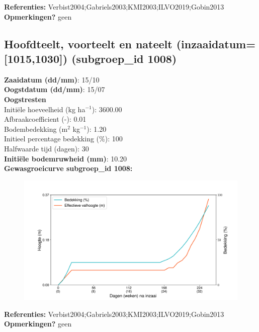 \documentclass{article}
\begin{document}
  \textbf{Referenties:} Verbist2004;Gabriels2003;KMI2003;ILVO2019;Gobin2013 \vspace{0.10cm} \\ 
  \textbf{Opmerkingen?} geen \vspace{0.10cm} \\ 
 \newpage 
 \subsection{Hoofdteelt, voorteelt en nateelt (inzaaidatum=[1015,1030]) (subgroep\_id 1008)} 
  \textbf{Zaaidatum (dd/mm)}: 15/10  \vspace{0.10cm} \\ 
  \textbf{Oogstdatum (dd/mm)}: 15/07  \vspace{0.10cm} \\ 
  \textbf{Oogstresten} \vspace{0.05cm} \\ 
  \tab Initi\"{e}le hoeveelheid (kg ha$^{-1}$): 3600.00 \vspace{0.05cm} \\ 
  \tab Afbraakcoefficient (-): 0.01 \vspace{0.05cm} \\ 
  \tab Bodembedekking (m$^2$ kg$^{-1}$): 1.20 \vspace{0.05cm} \\ 
  \tab Initieel percentage bedekking (\%): 100 \vspace{0.05cm} \\ 
  \tab Halfwaarde tijd (dagen): 30 \vspace{0.05cm} \\ 
  \textbf{Initi\"{e}le bodemruwheid (mm)}: 10.20 \vspace{0.05cm} \\ 
  \textbf{Gewasgroeicurve subgroep\_id 1008:} 
 \begin{center} \begin{figure}[H] \includegraphics[width=12.5cm]{temp/1008.png} \end{figure} \end{center} 
  \textbf{Referenties:} Verbist2004;Gabriels2003;KMI2003;ILVO2019;Gobin2013 \vspace{0.10cm} \\ 
  \textbf{Opmerkingen?} geen \vspace{0.10cm} \\ 
 \newpage 
\end{document}
